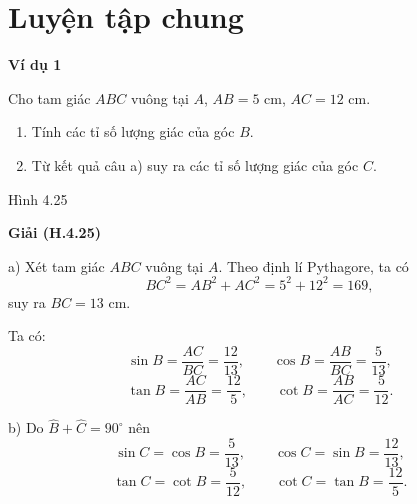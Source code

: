 
\section*{Luyện tập chung}

\begin{lesson}
    \textbf{Ví dụ 1}

    Cho tam giác $ABC$ vuông tại $A$, $AB=5$ cm, $AC=12$ cm.
    \begin{enumerate}[label=\alph*)]
        \item Tính các tỉ số lượng giác của góc $B$.
        \item Từ kết quả câu a) suy ra các tỉ số lượng giác của góc $C$.
    \end{enumerate}

    \begin{center}

        Hình 4.25
    \end{center}

    \textbf{Giải (H.4.25)}

    a) Xét tam giác $ABC$ vuông tại $A$. Theo định lí Pythagore, ta có
    \[
        BC^2=AB^2+AC^2=5^2+12^2=169,
    \]
    suy ra $BC=13$ cm.

    Ta có:
    \[
        \sin B=\dfrac{AC}{BC}=\dfrac{12}{13},\qquad
        \cos B=\dfrac{AB}{BC}=\dfrac{5}{13},
    \]
    \[
        \tan B=\dfrac{AC}{AB}=\dfrac{12}{5},\qquad
        \cot B=\dfrac{AB}{AC}=\dfrac{5}{12}.
    \]

    b) Do $\widehat{B}+\widehat{C}=90^\circ$ nên
    \[
        \sin C=\cos B=\dfrac{5}{13},\qquad
        \cos C=\sin B=\dfrac{12}{13},
    \]
    \[
        \tan C=\cot B=\dfrac{5}{12},\qquad
        \cot C=\tan B=\dfrac{12}{5}.
    \]


\end{lesson}
